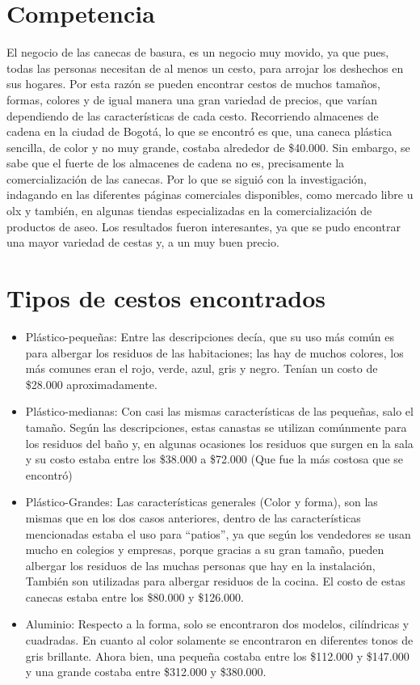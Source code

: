 \documentclass[letterpaper,12pt]{scrreprt}
\begin{document}
    \section{Competencia}
    El negocio de las canecas de basura, es un negocio muy movido, ya que pues, todas las personas necesitan de al menos un cesto, para arrojar los deshechos en sus hogares. Por esta razón se pueden encontrar cestos de muchos tamaños, formas, colores y de igual manera una gran variedad de precios, que varían dependiendo de las características de cada cesto.
Recorriendo almacenes de cadena en la ciudad de Bogotá, lo que se encontró es que, una caneca plástica sencilla, de color y no muy grande, costaba alrededor de \$40.000. Sin embargo, se sabe que el fuerte de los almacenes de cadena no es, precisamente la comercialización de las canecas.
 Por lo que se siguió con la investigación, indagando en las diferentes páginas comerciales disponibles, como mercado libre u olx y también, en algunas tiendas especializadas en la comercialización de productos de aseo. Los resultados fueron interesantes, ya que se pudo encontrar una mayor variedad de cestas y, a un muy buen precio.

    \section{Tipos de cestos encontrados}
        \begin{itemize}
        \item Plástico-pequeñas: Entre las descripciones decía, que su uso más común es para albergar los residuos de las habitaciones; las hay de muchos colores, los más comunes eran el rojo, verde, azul, gris y negro. Tenían un costo de \$28.000 aproximadamente.

        \item Plástico-medianas: Con casi las mismas características de las pequeñas, salo el tamaño. Según las descripciones, estas canastas se utilizan comúnmente para los residuos del baño y, en algunas ocasiones los residuos que surgen en la sala y su costo estaba entre los \$38.000 a \$72.000 (Que fue la más costosa que se encontró)

        \item Plástico-Grandes: Las características generales (Color y forma), son las mismas que en los dos casos anteriores, dentro de las características mencionadas estaba el uso para “patios”, ya que según los vendedores se usan mucho en colegios y empresas, porque gracias a su gran tamaño, pueden albergar los residuos de las muchas personas que hay en la instalación, También son utilizadas para albergar residuos de la cocina. El costo de estas canecas estaba entre los \$80.000 y \$126.000.

        \item Aluminio: Respecto a la forma, solo se encontraron dos modelos, cilíndricas y cuadradas. En cuanto al color solamente se encontraron en diferentes tonos de gris brillante. Ahora bien, una pequeña costaba entre los \$112.000 y \$147.000 y una grande costaba entre \$312.000 y \$380.000.


        \end{itemize}
\end{document}
